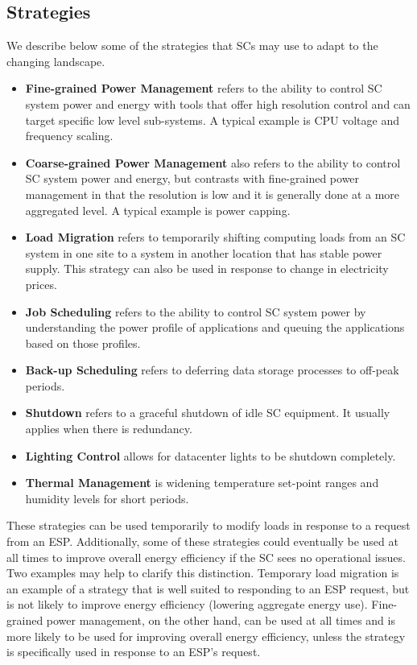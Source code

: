 \subsection{Strategies}
We describe below some of the strategies that SCs may use to adapt to the changing landscape.

\begin{itemize}
\item {\bf Fine-grained Power Management} refers to the ability to control SC system power 
and energy with tools that offer high resolution control and can target specific 
low level sub-systems. A typical example is CPU voltage and frequency scaling.

\item {\bf Coarse-grained Power Management} also refers to the ability to control SC 
system power and energy, but contrasts with fine-grained power management in 
that the resolution is low and it is generally done at a more aggregated level. 
A typical example is power capping.

\item {\bf Load Migration} refers to temporarily shifting computing loads from 
an SC system in one site to a system in another location that has stable power supply. 
This strategy can also be used in response to change in electricity prices.

\item {\bf Job Scheduling} refers to the ability to control SC system power 
by understanding the power profile of applications and queuing the 
applications based on those profiles.

\item {\bf Back-up Scheduling} refers to deferring data storage processes to off-peak periods.

\item {\bf Shutdown} refers to a graceful shutdown of idle SC equipment. It usually 
applies when there is redundancy.

\item {\bf Lighting Control} allows for datacenter lights to be shutdown completely.

\item {\bf Thermal Management} is widening temperature set-point ranges and 
humidity levels for short periods.
\end{itemize}

These strategies can be used temporarily to modify loads in response to a request from an ESP. Additionally, some of these strategies could eventually be used at all times to improve overall energy efficiency if the SC sees no operational issues. Two examples may help to clarify this distinction. Temporary load migration is an example of a strategy that is well suited to responding to an ESP request, but is not likely to improve energy efficiency (lowering aggregate energy use). Fine-grained power management, on the other hand, can be used at all times and is more likely to be used for improving overall energy efficiency, unless the strategy is specifically used in response to an ESP's request. 

